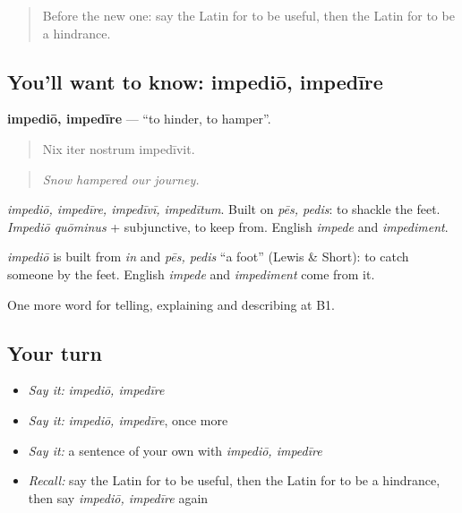 \begin{quote}
Before the new one: say the Latin for to be useful, then the Latin for to be a hindrance.
\end{quote}

\subsection*{You'll want to know: impediō, impedīre}
\textbf{impediō, impedīre} — \textquotedblleft{}to hinder, to hamper\textquotedblright{}.

\begin{quote}
Nix iter nostrum impedīvit.
\end{quote}

\begin{quote}
\emph{Snow hampered our journey.}
\end{quote}

\emph{impediō, impedīre, impedīvī, impedītum}. Built on \emph{pēs, pedis}: to shackle the feet. \emph{Impediō quōminus} + subjunctive, to keep from. English \emph{impede} and \emph{impediment}.

\begin{cousinweb}
\emph{impediō} is built from \emph{in} and \emph{pēs, pedis} \textquotedblleft{}a foot\textquotedblright{} (Lewis \& Short): to catch someone by the feet. English \emph{impede} and \emph{impediment} come from it.
\end{cousinweb}

\begin{grammarlens}[title={What you've built}]
One more word for telling, explaining and describing at B1.
\end{grammarlens}

\subsection*{Your turn}
\begin{itemize}
\raggedright
  \item \emph{Say it:} \emph{impediō, impedīre}
  \item \emph{Say it:} \emph{impediō, impedīre}, once more
  \item \emph{Say it:} a sentence of your own with \emph{impediō, impedīre}
  \item \emph{Recall:} say the Latin for to be useful, then the Latin for to be a hindrance, then say \emph{impediō, impedīre} again
\end{itemize}

